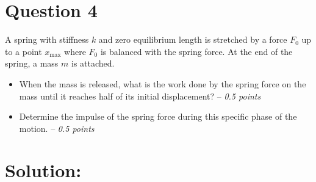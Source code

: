 \section*{Question 4}
A spring with stiffness $k$ and zero equilibrium length is stretched by a force $F_0$ up to a point $x_{\text{max}}$ where $F_0$ is balanced with the spring force. At the end of the spring, a mass $m$ is attached. 
\begin{itemize}
    \item [\textbf{(a)}] When the mass is released, what is the work done by the spring force on the mass until it reaches half of its initial displacement? -- \textit{0.5 points}
    \item [\textbf{(b)}] Determine the impulse of the spring force during this specific phase of the motion. -- \textit{0.5 points}
\end{itemize} 

\section*{Solution:}
